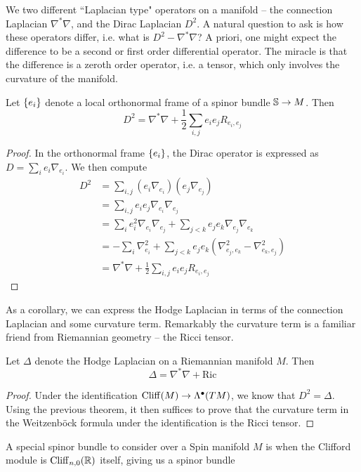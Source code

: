 %
We two different ``Laplacian type" operators on a manifold -- the connection
Laplacian $\nabla^*\nabla$, and the Dirac Laplacian $D^2$. A natural question
to ask is how these operators differ, i.e. what is $D^2 - \nabla^*\nabla$? A priori,
one might expect the difference to be a second or first order differential operator.
The miracle is that the difference is a zeroth order operator, i.e. a tensor, which
only involves the curvature of the manifold.
%
\begin{thm}
Let $\set{e_i}$ denote a local orthonormal frame of a spinor bundle $\S \to M$. Then
\[
D^2 = \nabla^*\nabla + \frac{1}{2}\sum_{i, j} e_i e_j R_{e_i, e_j}
\]
\end{thm}
%
\begin{proof} %
In the orthonormal frame $\set{e_i}$, the Dirac operator is expressed as
$D = \sum_i e_i\nabla_{e_i}$. We then compute
\begin{align*}
D^2 &= \sum_{i,j}(e_i\nabla_{e_i})(e_j\nabla_{e_j}) \\
&= \sum_{i,j} e_ie_j\nabla_{e_i}\nabla_{e_j} \\
&= \sum_i e_i^2\nabla_{e_i}\nabla_{e_j} + \sum_{j < k} e_j e_k\nabla_{e_j}\nabla_{e_k} \\
&= -\sum_i \nabla^2_{e_i}
+ \sum_{j < k} e_je_k (\nabla^2_{e_j, e_k} - \nabla^2_{e_k, e_j}) \\
&= \nabla^*\nabla + \frac{1}{2}\sum_{i, j} e_i e_j R_{e_i, e_j}
\end{align*}
\end{proof}
%
As a corollary, we can express the Hodge Laplacian in terms of the connection Laplacian
and some curvature term. Remarkably the curvature term is a familiar friend from
Riemannian geometry -- the Ricci tensor.
%
\begin{cor}
Let $\Delta$ denote the Hodge Laplacian on a Riemannian manifold $M$. Then
\[
\Delta = \nabla^*\nabla + \mathrm{Ric}
\]
\end{cor}
%
\begin{proof} %
Under the identification $\Cliff(M) \to \Lambda^\bullet(TM)$, we know that
$D^2 = \Delta$. Using the previous theorem, it then suffices to prove that the curvature
term in the Weitzenb\"ock formula under the identification is the Ricci tensor.
\end{proof}
A special spinor bundle to consider over a Spin manifold $M$ is when the Clifford
module is $\Cliff_{n,0}(\R)$ itself, giving us a spinor bundle
